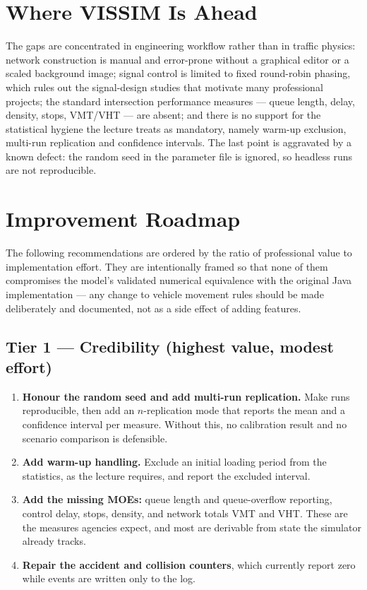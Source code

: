 \documentclass[11pt,a4paper]{article}
\begin{document}
\section{Where VISSIM Is Ahead}
The gaps are concentrated in engineering workflow rather than in traffic physics:
network construction is manual and error-prone without a graphical editor or a scaled
background image; signal control is limited to fixed round-robin phasing, which rules
out the signal-design studies that motivate many professional projects; the standard
intersection performance measures --- queue length, delay, density, stops, VMT/VHT ---
are absent; and there is no support for the statistical hygiene the lecture treats as
mandatory, namely warm-up exclusion, multi-run replication and confidence intervals.
The last point is aggravated by a known defect: the random seed in the parameter file
is ignored, so headless runs are not reproducible.

\section{Improvement Roadmap}
The following recommendations are ordered by the ratio of professional value to
implementation effort. They are intentionally framed so that none of them compromises
the model's validated numerical equivalence with the original Java implementation ---
any change to vehicle movement rules should be made deliberately and documented, not
as a side effect of adding features.

\subsection*{Tier 1 --- Credibility (highest value, modest effort)}
\begin{enumerate}
  \item \textbf{Honour the random seed and add multi-run replication.} Make runs
        reproducible, then add an $n$-replication mode that reports the mean and a
        confidence interval per measure. Without this, no calibration result and no
        scenario comparison is defensible.
  \item \textbf{Add warm-up handling.} Exclude an initial loading period from the
        statistics, as the lecture requires, and report the excluded interval.
  \item \textbf{Add the missing MOEs:} queue length and queue-overflow reporting,
        control delay, stops, density, and network totals VMT and VHT. These are the
        measures agencies expect, and most are derivable from state the simulator
        already tracks.
  \item \textbf{Repair the accident and collision counters}, which currently report
        zero while events are written only to the log.
\end{enumerate}
\end{document}
